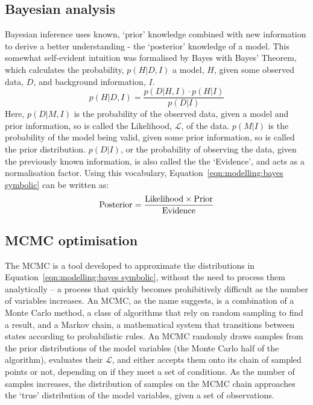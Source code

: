 \subsection{Bayesian analysis}
Bayesian inference uses known, `prior' knowledge combined with new information to derive a better understanding - the `posterior' knowledge of a model. This somewhat self-evident intuition was formalised by Bayes with Bayes' Theorem, which calculates the probability, $p(H | D, I)$ a model, $H$, given some observed data, $D$, and background information, $I$.
\begin{equation}
    \label{eqn:modelling:bayes symbolic}
    p(H | D,I) = \frac{p(D | H, I) \cdot p(H | I)}{p(D|I)}
\end{equation}
Here, $p(D | M, I)$ is the probability of the observed data, given a model and prior information, so is called the Likelihood, $\mathcal{L}$, of the data.
$p(M|I)$ is the probability of the model being valid, given some prior information, so is called the prior distribution. $p(D | I)$, or the probability of observing the data, given the previously known information, is also called the the `Evidence', and acts as a normalisation factor. Using this vocabulary, Equation~\ref{eqn:modelling:bayes symbolic} can be written as:
\begin{equation}
    \label{eqn:modelling:bayes english}
    \rm Posterior = \frac{Likelihood \times Prior}{Evidence}
\end{equation}

\subsection{MCMC optimisation}
The MCMC is a tool developed to approximate the distributions in Equation~\ref{eqn:modelling:bayes symbolic}, without the need to process them analytically -- a process that quickly becomes prohibitively difficult as the number of variables increases.
An MCMC, as the name suggests, is a combination of a Monte Carlo method, a class of algorithms that rely on random sampling to find a result, and a Markov chain, a mathematical system that transitions between states according to probabilistic rules. An MCMC randomly draws samples from the prior distributions of the model variables (the Monte Carlo half of the algorithm), evaluates their $\mathcal{L}$, and either accepts them onto its chain of sampled points or not, depending on if they meet a set of conditions. As the number of samples increases, the distribution of samples on the MCMC chain approaches the `true' distribution of the model variables, given a set of observations.

